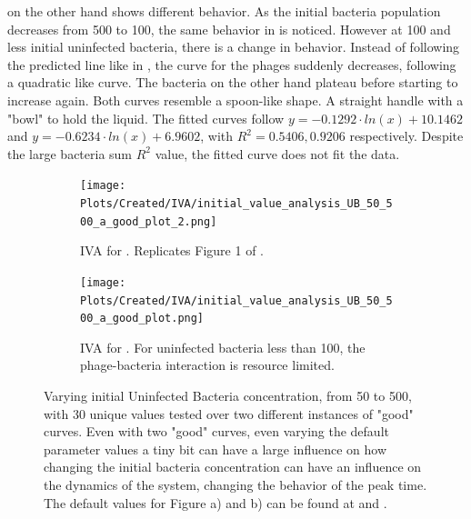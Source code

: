  on the other hand shows different behavior. 
As the initial bacteria population decreases from 500 to 100, the same behavior in  is noticed.
However at 100 and less initial uninfected bacteria, there is a change in behavior. 
Instead of following the predicted line like in , the curve for the phages suddenly decreases, following a quadratic like curve. 
The bacteria on the other hand plateau before starting to increase again. 
Both curves resemble a spoon-like shape. A straight handle with a "bowl" to hold the liquid. 
The fitted curves follow $y = -0.1292\cdot ln(x) + 10.1462$ and $y = -0.6234\cdot ln(x)+6.9602$, with $R^2=0.5406, 0.9206$ respectively. 
Despite the large bacteria sum $R^2$ value, the fitted curve does not fit the data. 

\begin{figure}
    \centering
    \begin{subfigure}{1\linewidth}
        \centering
        \texttt{[image: Plots/Created/IVA/initial\_value\_analysis\_UB\_50\_500\_a\_good\_plot\_2.png]}
        \caption{
            IVA for . 
            Replicates Figure 1 of \citet{mullaExtremeDiversityPhage2024}. 
        }
        \label{fig:created:initial_value_analysis_UB_50_500_a_good_plot_2}
    \end{subfigure}
    \hfill
    \begin{subfigure}{1\linewidth}
        \centering
        \texttt{[image: Plots/Created/IVA/initial\_value\_analysis\_UB\_50\_500\_a\_good\_plot.png]}
        \caption{
            IVA for . 
            For uninfected bacteria less than 100, the phage-bacteria interaction is resource limited. 
        }
        \label{fig:created:initial_value_analysis_UB_50_500_a_good_plot}
    \end{subfigure}
    \caption{
        Varying initial Uninfected Bacteria concentration, from 50 to 500, with 30 unique values tested over two different instances of "good" curves. 
        Even with two "good" curves, even varying the default parameter values a tiny bit can have a large influence on how changing the initial bacteria concentration can have an influence on the dynamics of the system, changing the behavior of the peak time. 
        The default values for Figure a) and b) can be found at  and . 
    }
\end{figure}


